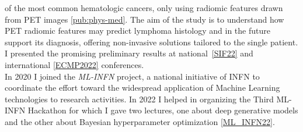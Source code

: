 \begin{cvcontent}
  of the most common hematologic cancers, only using radiomic features 
  drawn from PET images \ref{pub:phys-med}. The aim of the study is to 
  understand how PET radiomic features may predict lymphoma histology 
  and in the future support its diagnosis, offering non-invasive solutions 
  tailored to the single patient. I presented the promising preliminary 
  results at national~\hyperlink{sif-2022}{[SIF22]} and 
  international \hyperlink{ecmp-2022}{[ECMP2022]} conferences.
  \\ [2mm]
  In 2020 I joined the \emph{ML-INFN} project, a national initiative 
  of INFN to coordinate the effort toward the widespread application 
  of Machine Learning technologies to research activities. In 2022 I 
  helped in organizing the Third ML-INFN Hackathon for which I gave
  two lectures, one about deep generative models and the other about
  Bayesian hyperparameter optimization \hyperlink{mlinfn-2022}{[ML\_INFN22]}.
\end{cvcontent}